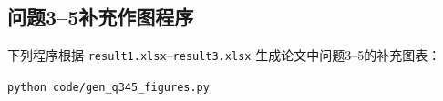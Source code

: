 \documentclass[withoutpreface,bwprint]{cumcmthesis}
\begin{document}
\begin{appendices}


\section{问题3--5补充作图程序}
\label{app:code-fig}
下列程序根据 \texttt{result1.xlsx}--\texttt{result3.xlsx} 生成论文中问题3--5的补充图表：
\begin{center}
\texttt{python code/gen\_q345\_figures.py}
\end{center}



\end{appendices}
\end{document}
